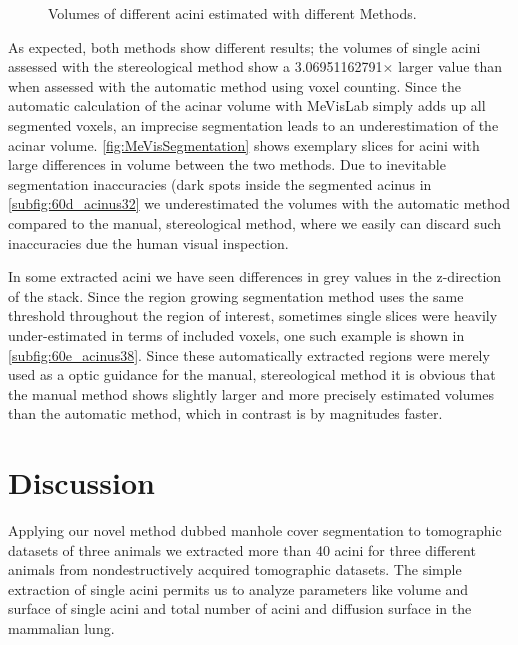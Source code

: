 \documentclass[twoside,paper=a4,abstract=true,english,DIV=calc]{scrartcl}
\newcommand{\difference}{3.06951162791} %
\begin{document}
\begin{figure}
	\caption{Volumes of different acini estimated with different Methods.}
	\label{fig:VolumeMeVisVsSTEPanizer}%
\end{figure}

As expected, both methods show different results; the volumes of single acini assessed with the stereological method show a \difference\(\times\) larger value than when assessed with the automatic method using voxel counting.
Since the automatic calculation of the acinar volume with MeVisLab simply adds up all segmented voxels, an imprecise segmentation leads to an underestimation of the acinar volume.
\autoref{fig:MeVisSegmentation} shows exemplary slices for acini with large differences in volume between the two methods.
Due to inevitable segmentation inaccuracies (dark spots inside the segmented acinus in \autoref{subfig:60d_acinus32} we underestimated the volumes with the automatic method compared to the manual, stereological method, where we easily can discard such inaccuracies due the human visual inspection.

In some extracted acini we have seen differences in grey values in the z-direction of the stack.
Since the region growing segmentation method uses the same threshold throughout the region of interest, sometimes single slices were heavily under-estimated in terms of included voxels, one such example is shown in \autoref{subfig:60e_acinus38}.
Since these automatically extracted regions were merely used as a optic guidance for the manual, stereological method it is obvious that the manual method shows slightly larger and more precisely estimated volumes than the automatic method, which in contrast is by magnitudes faster.

\section{Discussion}
Applying our novel method dubbed manhole cover segmentation to tomographic datasets of three animals we extracted more than 40 acini for three different animals from nondestructively acquired tomographic datasets.
The simple extraction of single acini permits us to analyze parameters like volume and surface of single acini and total number of acini and diffusion surface in the mammalian lung.
\end{document}
